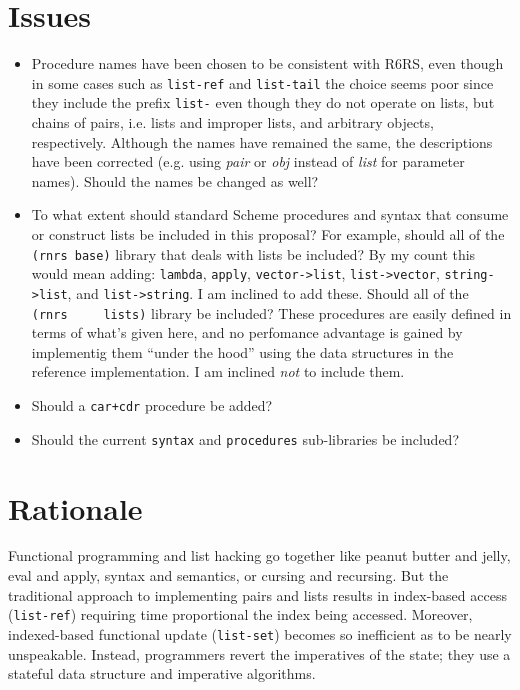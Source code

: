 \section{{Issues}}\label{issues}

\begin{itemize}
\tightlist
\item
  Procedure names have been chosen to be consistent with R6RS, even
  though in some cases such as \texttt{list-ref} and \texttt{list-tail}
  the choice seems poor since they include the prefix \texttt{list-}
  even though they do not operate on lists, but chains of pairs, i.e.
  lists and improper lists, and arbitrary objects, respectively.
  Although the names have remained the same, the descriptions have been
  corrected (e.g. using \emph{pair} or \emph{obj} instead of \emph{list}
  for parameter names). Should the names be changed as well?
\item
  To what extent should standard Scheme procedures and syntax that
  consume or construct lists be included in this proposal? For example,
  should all of the \texttt{(rnrs\ base)} library that deals with lists
  be included? By my count this would mean adding: \texttt{lambda},
  \texttt{apply}, \texttt{vector-\textgreater{}list},
  \texttt{list-\textgreater{}vector},
  \texttt{string-\textgreater{}list}, and
  \texttt{list-\textgreater{}string}. I am inclined to add these. Should
  all of the \texttt{(rnrs\ \ \ \ \ lists)} library be included? These
  procedures are easily defined in terms of what's given here, and no
  perfomance advantage is gained by implementig them ``under the hood''
  using the data structures in the reference implementation. I am
  inclined \emph{not} to include them.
\item
  Should a \texttt{car+cdr} procedure be added?
\item
  Should the current \texttt{syntax} and \texttt{procedures}
  sub-libraries be included?
\end{itemize}

\section{{Rationale}}\label{rationale}

Functional programming and list hacking go together like peanut butter
and jelly, eval and apply, syntax and semantics, or cursing and
recursing. But the traditional approach to implementing pairs and lists
results in index-based access (\texttt{list-ref}) requiring time
proportional the index being accessed. Moreover, indexed-based
functional update (\texttt{list-set}) becomes so inefficient as to be
nearly unspeakable. Instead, programmers revert the imperatives of the
state; they use a stateful data structure and imperative algorithms.

